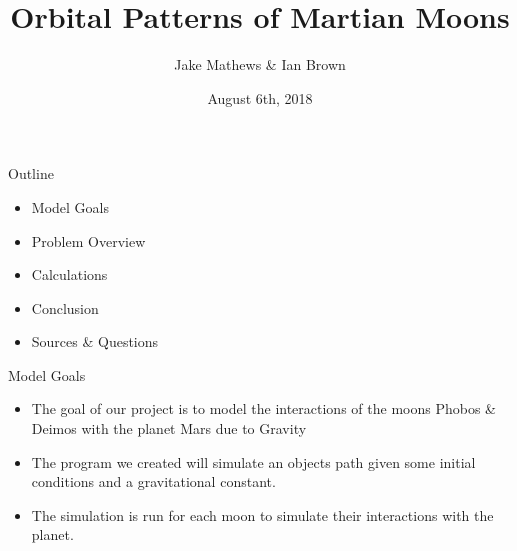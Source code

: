 \documentclass{beamer}  %
\title[Orbital Patterns of Martian Moons]{Orbital Patterns of Martian Moons}
\author{Jake Mathews \& Ian Brown}
\institute{Wentworth Institute of Technology}
\date{August 6th, 2018}
\begin{document}
\begin{frame}
\titlepage
\end{frame}


\begin{frame}{Outline} %

 \begin{itemize}
  \item Model Goals
  \item Problem Overview
  \item Calculations
  \item Conclusion
  \item Sources \& Questions
 \end{itemize}

\end{frame}


\begin{frame}{Model Goals} %
\begin{itemize}
	\item The goal of our project is to model the interactions of the moons Phobos \& Deimos with the planet Mars due to Gravity
	\item The program we created will simulate an objects path given some initial conditions and a gravitational constant. 
	\item The simulation is run for each moon to simulate their interactions with the planet.
\end{itemize}
\end{frame}
\end{document}
